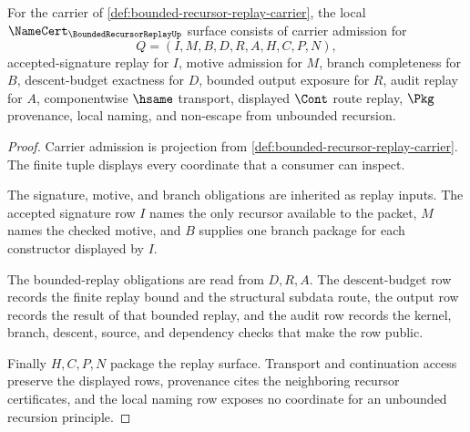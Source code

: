 \begin{theorem}
\label{thm:bounded-recursor-replay-namecert-obligations}
For the carrier of \autoref{def:bounded-recursor-replay-carrier}, the local $\NameCert_{\BoundedRecursorReplayUp}$ surface consists of carrier admission for
$$
Q=(I,M,B,D,R,A,H,C,P,N),
$$
accepted-signature replay for $I$, motive admission for $M$, branch completeness for $B$, descent-budget exactness for $D$, bounded output exposure for $R$, audit replay for $A$, componentwise $\hsame$ transport, displayed $\Cont$ route replay, $\Pkg$ provenance, local naming, and non-escape from unbounded recursion.
\end{theorem}
\begin{proof}
Carrier admission is projection from \autoref{def:bounded-recursor-replay-carrier}. The finite tuple displays every coordinate that a consumer can inspect.

The signature, motive, and branch obligations are inherited as replay inputs. The accepted signature row $I$ names the only recursor available to the packet, $M$ names the checked motive, and $B$ supplies one branch package for each constructor displayed by $I$.

The bounded-replay obligations are read from $D,R,A$. The descent-budget row records the finite replay bound and the structural subdata route, the output row records the result of that bounded replay, and the audit row records the kernel, branch, descent, source, and dependency checks that make the row public.

Finally $H,C,P,N$ package the replay surface. Transport and continuation access preserve the displayed rows, provenance cites the neighboring recursor certificates, and the local naming row exposes no coordinate for an unbounded recursion principle.
\end{proof}

